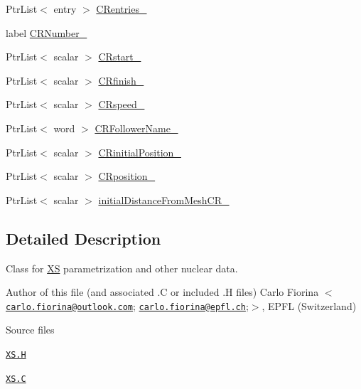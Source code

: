 \begin{DoxyCompactItemize}
\item 
Ptr\+List$<$ entry $>$ \hyperlink{classFoam_1_1XS_a3db65236cfa499f3d1af3a6d138b901b}{C\+Rentries\+\_\+}
\item 
label \hyperlink{classFoam_1_1XS_aca1bc9cd45aa65bba5648dfef95f3ade}{C\+R\+Number\+\_\+}
\item 
Ptr\+List$<$ scalar $>$ \hyperlink{classFoam_1_1XS_ae701fac84afdd0314da1c5afd8167c0b}{C\+Rstart\+\_\+}
\item 
Ptr\+List$<$ scalar $>$ \hyperlink{classFoam_1_1XS_a95fdbf3240e83a55b03524b573c4d004}{C\+Rfinish\+\_\+}
\item 
Ptr\+List$<$ scalar $>$ \hyperlink{classFoam_1_1XS_a65e78652b96aa06c69280257ca9aa536}{C\+Rspeed\+\_\+}
\item 
Ptr\+List$<$ word $>$ \hyperlink{classFoam_1_1XS_a8179271f63974b5ee1ca293495877e9f}{C\+R\+Follower\+Name\+\_\+}
\item 
Ptr\+List$<$ scalar $>$ \hyperlink{classFoam_1_1XS_a8d008d308ad81906d031bf59ee715e3b}{C\+Rinitial\+Position\+\_\+}
\item 
Ptr\+List$<$ scalar $>$ \hyperlink{classFoam_1_1XS_a40a7dacaf9eb33f6bde0de0da08f30de}{C\+Rposition\+\_\+}
\item 
Ptr\+List$<$ scalar $>$ \hyperlink{classFoam_1_1XS_a950f9c7de67d1956bd963be294a6ab4e}{initial\+Distance\+From\+Mesh\+C\+R\+\_\+}
\end{DoxyCompactItemize}


\subsection{Detailed Description}
Class for \hyperlink{classFoam_1_1XS}{XS} parametrization and other nuclear data. 

\label{_Description}%
 Author of this file (and associated .C or included .H files) Carlo Fiorina $<$\href{mailto:carlo.fiorina@outlook.com}{\tt carlo.\+fiorina@outlook.\+com}; \href{mailto:carlo.fiorina@epfl.ch}{\tt carlo.\+fiorina@epfl.\+ch};$>$, E\+P\+FL (Switzerland)

\begin{DoxyParagraph}{Source files}

\begin{DoxyItemize}
\item \href{../../../home/carlo/data/GeN-Foam/GeN-Foam_ffn/GeN-Foam/GeN-Foam/classes/neutronics/XS/XS/XS.H}{\tt X\+S.\+H} 
\item \href{../../../home/carlo/data/GeN-Foam/GeN-Foam_ffn/GeN-Foam/GeN-Foam/classes/neutronics/XS/XS/XS.C}{\tt X\+S.\+C} 
\end{DoxyItemize}
\end{DoxyParagraph}


